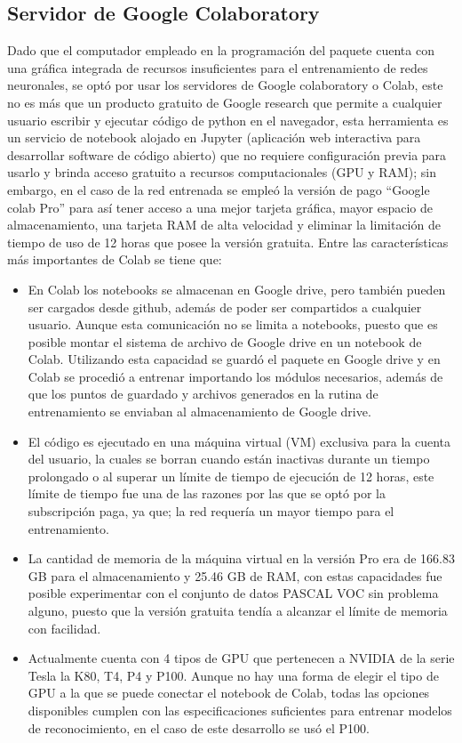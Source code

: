 \subsection{Servidor de Google Colaboratory}
Dado que el computador empleado en la programación del paquete cuenta con una gráfica integrada de recursos insuficientes para el entrenamiento de redes neuronales, se optó por usar los servidores de Google colaboratory o Colab, este no es más que un producto gratuito de Google research que permite a cualquier usuario escribir y ejecutar código de python en el navegador, esta herramienta es un servicio de notebook alojado en Jupyter (aplicación web interactiva para desarrollar software de código abierto) que no requiere configuración previa para usarlo y brinda acceso gratuito a recursos computacionales (GPU y RAM); sin embargo, en el caso de la red entrenada se empleó la versión de pago ``Google colab Pro'' para así tener acceso a una mejor tarjeta gráfica, mayor espacio de almacenamiento, una tarjeta RAM de alta velocidad y eliminar la limitación de tiempo de uso de 12 horas que posee la versión gratuita. Entre las características más importantes de Colab se tiene que:
\begin{itemize}
    \item En Colab los notebooks se almacenan en Google drive, pero también pueden ser cargados desde github, además de poder ser compartidos a cualquier usuario. Aunque esta comunicación no se limita a notebooks, puesto que es posible montar el sistema de archivo de Google drive en un notebook de Colab. Utilizando esta capacidad se guardó el paquete en Google drive y en Colab se procedió a entrenar importando los módulos necesarios, además de que los puntos de guardado y archivos generados en la rutina de entrenamiento se enviaban al almacenamiento de Google drive.
    \item El código es ejecutado en una máquina virtual (VM) exclusiva para la cuenta del usuario, la cuales se borran cuando están inactivas durante un tiempo prolongado o al superar un límite de tiempo de ejecución de 12 horas, este límite de tiempo fue una de las razones por las que se optó por la subscripción paga, ya que; la red requería un mayor tiempo para el entrenamiento.
    \item La cantidad de memoria de la máquina virtual en la versión Pro era de 166.83 GB para el almacenamiento y 25.46 GB de RAM, con estas capacidades fue posible experimentar con el conjunto de datos PASCAL VOC sin problema alguno, puesto que la versión gratuita tendía a alcanzar el límite de memoria con facilidad.
    \item Actualmente cuenta con 4 tipos de GPU que pertenecen a NVIDIA de la serie Tesla la K80, T4, P4 y P100. Aunque no hay una forma de elegir el tipo de GPU a la que se puede conectar el notebook de Colab, todas las opciones disponibles cumplen con las especificaciones suficientes para entrenar modelos de reconocimiento, en el caso de este desarrollo se usó el P100.
\end{itemize}
